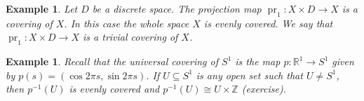 \documentclass[11pt, letterpaper, oneside]{report}
\theoremstyle{pplain}
\theoremstyle{ddefinition}
\newtheorem{example}[theorem]{Example}
\theoremstyle{nnn}
\theoremstyle{eexercise}
\newcommand{\Z}{{\mathbb Z}}
\newcommand{\R}{{\mathbb R}}
\DeclareMathOperator\pr{pr}
\begin{document}
\begin{example}
Let $D$ be a discrete space. The projection map $\pr_{1}\colon X \times D \to X$ is a covering of $X$. 
In this case the whole space $X$ is evenly covered. We say that $\pr_{1}\colon X \times D \to X$ is 
a \emph{trivial covering} of $X$. 
\end{example}


\begin{example}
Recall that the universal covering of $S^{1}$ is the map $p\colon \R^{1} \to S^{1}$ given by 
$p(s) = (\cos 2\pi s, \sin 2\pi s)$. If  $U\subseteq S^{1}$ is  any open set such that $U\neq S^{1}$, 
then $p^{-1}(U)$ is evenly covered and $p^{-1}(U) \cong U\times \Z$ (exercise). 

\

\end{example}
\end{document}
